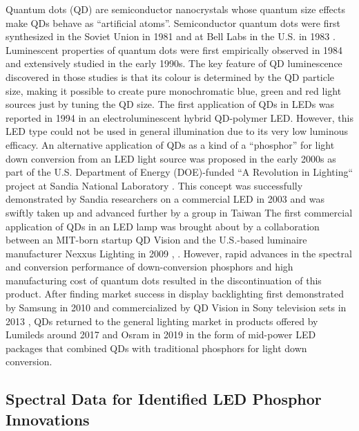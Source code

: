 \documentclass[10pt]{article}
\begin{document}
Quantum dots (QD) are semiconductor nanocrystals whose quantum size effects make QDs behave as “artificial atoms”. Semiconductor quantum dots were first synthesized in the Soviet Union in 1981 \cite{ekimov1981quantum} and at Bell Labs in the U.S. in 1983 \cite{Rossetti1983}. Luminescent properties of quantum dots were first empirically observed in 1984 \cite{fojtik1984photo} and extensively studied in the early 1990s. The key feature of QD luminescence discovered in those studies is that its colour is determined by the QD particle size, making it possible to create pure monochromatic blue, green and red light sources just by tuning the QD size. The first application of QDs in LEDs was reported in 1994 in an electroluminescent hybrid QD-polymer LED. However, this LED type could not be used in general illumination due to its very low luminous efficacy. An alternative application of QDs as a kind of a “phosphor” for light down conversion from an LED light source was proposed in the early 2000s as part of the U.S. Department of Energy (DOE)-funded “A Revolution in Lighting“ project at Sandia National Laboratory \cite{simmonsfinal}. This concept was successfully demonstrated by Sandia researchers on a commercial LED in 2003 \cite{shea_rohwer_development_2004}\cite{noauthor_sandia_nodate} and was swiftly taken up and advanced further by a group in Taiwan \cite{Chen_2005}\cite{Hsueh_Shih_Chen_2006} The first commercial application of QDs in an LED lamp was brought about by a collaboration between an MIT-born startup QD Vision and the U.S.-based luminaire manufacturer Nexxus Lighting in 2009 \cite{ledprof_nexxusqd}, \cite{bourzac2013quantum}. However, rapid advances in the spectral and conversion performance of down-conversion phosphors and high manufacturing cost of quantum dots resulted in the discontinuation of this product. After finding market success in display backlighting first demonstrated by Samsung in 2010 \cite{Jang2010} and commercialized by QD Vision in Sony television sets in 2013 \cite{bourzac2013quantum}, QDs returned to the general lighting market in products offered by Lumileds \cite{noauthor_global_2017}\cite{noauthor_quantum_2020} around 2017 and Osram in 2019 \cite{osramqdots} in the form of mid-power LED packages that combined QDs with traditional phosphors for light down conversion.

\subsection{Spectral Data for Identified LED Phosphor Innovations}
\end{document}
